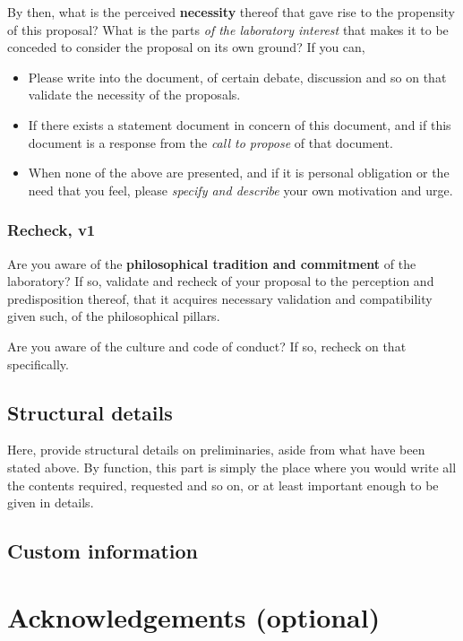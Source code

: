 \documentclass[10pt,a4paper]{article}
\begin{document}
By then, what is the perceived \textbf{necessity} thereof that gave rise to the propensity of this proposal? What is the parts \textit{of the laboratory interest} that makes it to be conceded to consider the proposal on its own ground? If you can, 
\begin{itemize}
    \item Please write into the document, of certain debate, discussion and so on that validate the necessity of the proposals. 
    \item If there exists a statement document in concern of this document, and if this document is a response from the \textit{call to propose} of that document. 
    \item When none of the above are presented, and if it is personal obligation or the need that you feel, please \textit{specify and describe} your own motivation and urge. 
\end{itemize}

\subsubsection{Recheck, v1}

Are you aware of the \textbf{philosophical tradition and commitment} of the laboratory? If so, validate and recheck of your proposal to the perception and predisposition thereof, that it acquires necessary validation and compatibility given such, of the philosophical pillars. 

Are you aware of the culture and code of conduct? If so, recheck on that specifically. 

\subsection{Structural details}

Here, provide structural details on preliminaries, aside from what have been stated above. By function, this part is simply the place where you would write all the contents required, requested and so on, or at least important enough to be given in details. 



\clearpage
\subsection{Custom information}



\clearpage

\section*{Acknowledgements (optional)}
\end{document}
